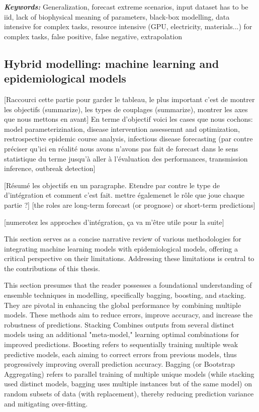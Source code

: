 \textit{\textbf{Keywords:}} Generalization, forecast extreme scenarios, input dataset has to be iid, lack of biophysical meaning of parameters, black-box modelling, data intensive for complex tasks, resource intensive (GPU, electricity, materials...) for complex tasks, false positive, false negative, extrapolation


\subsection{Hybrid modelling: machine learning and epidemiological models}

[Raccourci cette partie pour garder le tableau, le plus important c'est de montrer les objectifs (summarize), les types de couplages (summarize), montrer les axes que nous mettons en avant]
En terme d'objectif voici les cases que nous cochons: model parameterizination, disease intervention assessemnt and optimization, restrospective epidemic course analysis, infectious disease forecasting (par contre préciser qu'ici en réalité nous avons n'avons pas fait de forecast dans le sens statistique du terme jusqu'à aller à l'évaluation des performances, transmission inference, outbreak detection]

[Résumé les objectifs en un paragraphe. Etendre par contre le type de d'intégration et comment c'est fait. mettre égalemenet le rôle que joue chaque partie ?] [the roles are long-term forecast (or prognose) or short-term predictions]

[numerotez les approches d'intégration, ça va m'être utile pour la suite]

This section serves as a concise narrative review of various methodologies for integrating machine learning models with epidemiological models, offering a critical perspective on their limitations. Addressing these limitations is central to the contributions of this thesis.

This section presumes that the reader possesses a foundational understanding of ensemble techniques in modelling, specifically bagging, boosting, and stacking. They are pivotal in enhancing the global performance by combining multiple models. These methods aim to reduce errors, improve accuracy, and increase the robustness of predictions. Stacking Combines outputs from several distinct models using an additional "meta-model," learning optimal combinations for improved predictions. Boosting refers to sequentially training multiple weak predictive models, each aiming to correct errors from previous models, thus progressively improving overall prediction accuracy. Bagging (or Bootstrap Aggregating) refers to parallel training of multiple unique models (while stacking used distinct models, bagging uses multiple instances but of the same model) on random subsets of data (with replacement), thereby reducing prediction variance and mitigating over-fitting.

